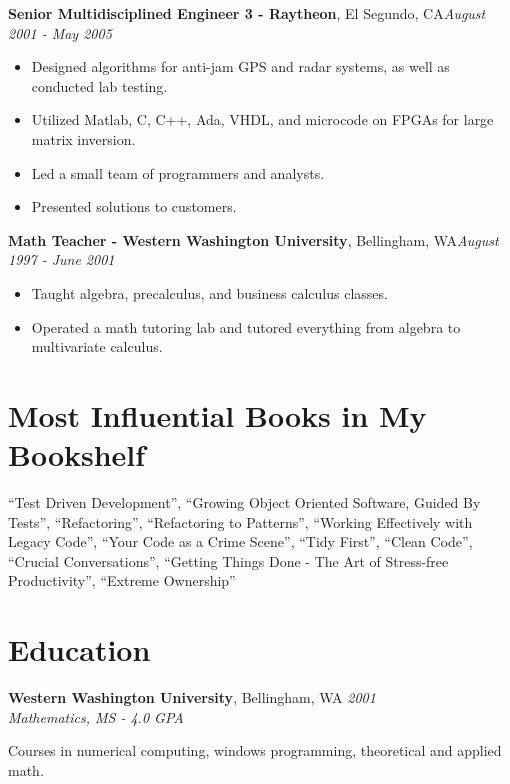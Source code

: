 \documentclass[letter,11pt]{article}
\newenvironment{noindentblock}{%
  \begin{list}{}{%
    \setlength{\leftmargin}{0in} %
    \setlength{\rightmargin}{.25in} %
    \setlength{\topsep}{0pt} %
    \setlength{\parsep}{0pt} %
  }
  \item[]}{\end{list}}
\begin{document}
\pagebreak
\noindent
\textbf{Senior Multidisciplined Engineer 3 - Raytheon}, El Segundo, CA\hfill \textit{August 2001 - May 2005}
\begin{itemize}[leftmargin=*,itemsep=0pt, parsep=0pt,label=$\diamond$]
\item Designed algorithms for anti-jam GPS and radar systems, as well as conducted lab testing.
\item Utilized Matlab, C, C++, Ada, VHDL, and microcode on FPGAs for large matrix inversion.
\item Led a small team of programmers and analysts.
\item Presented solutions to customers.
\end{itemize}

\noindent
\textbf{Math Teacher - Western Washington University}, Bellingham, WA\hfill \textit{August 1997 - June 2001}
\begin{itemize}[leftmargin=*,itemsep=0pt, parsep=0pt,label=$\diamond$]
\item Taught algebra, precalculus, and business calculus classes.
\item Operated a math tutoring lab and tutored everything from algebra to multivariate calculus.
\end{itemize}

\section*{Most Influential Books in My  Bookshelf}
``Test Driven Development'', ``Growing Object Oriented Software, Guided By Tests'', ``Refactoring'', ``Refactoring to Patterns'', ``Working Effectively with Legacy Code'', ``Your Code as a Crime Scene'', ``Tidy First'', ``Clean Code'', ``Crucial Conversations'', ``Getting Things Done - The Art of Stress-free Productivity'', ``Extreme Ownership''

\section*{Education}

\noindent
\textbf{Western Washington University}, Bellingham, WA \hfill \textit{2001}\\
\textit{Mathematics, MS - 4.0 GPA} 
\begin{noindentblock}
Courses in numerical computing, windows programming, theoretical and applied math.
\end{noindentblock}
\end{document}

